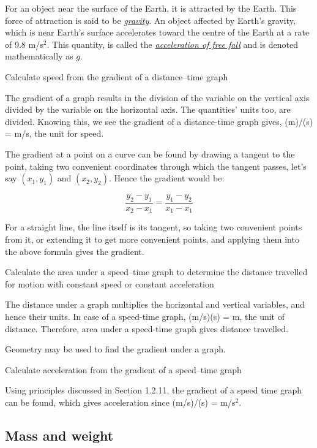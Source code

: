 For an object near the surface of the Earth, it is attracted by the Earth. This force of attraction
is said to be \ul{\emph{gravity}}. An object affected by Earth's gravity, which is near Earth's
surface accelerates toward the
centre of the Earth at a rate of 9.8 m/s$^2$. This quantity, is called the \ul{\emph{acceleration
of free fall}} and is denoted mathematically as $g$.

\begin{point}
Calculate speed from the gradient of a distance–time graph
\end{point}

The gradient of a graph results in the division of the variable on the vertical axis divided by
the variable on the horizontal axis. The quantities' units too, are divided. Knowing this, we
see the gradient of a distance-time graph gives, (m)/(s) = m/s, the unit for speed.

The gradient at a point on a curve can be found by drawing a tangent to the point, taking two
convenient coordinates through which the tangent passes, let's say $(x_1, y_1)$ and $(x_2, y_2)$.
Hence the gradient would be:

$$ \frac{y_2 - y_1}{x_2 - x_1} = \frac{y_1 - y_2}{x_1 - x_1} $$

For a straight line, the line itself is its tangent, so taking two convenient points from it,
or extending it to get more convenient points, and applying them into the above formula gives
the gradient.

\begin{point}
Calculate the area under a speed–time graph to determine the distance travelled for motion with constant
speed or constant acceleration
\end{point}

The distance under a graph multiplies the horizontal and vertical variables, and hence their units.
In case of a speed-time graph, (m/s)(s) = m, the unit of distance. Therefore, area under a
speed-time graph gives distance travelled.

Geometry may be used to find the gradient under a graph.

\begin{point}
Calculate acceleration from the gradient of a speed–time graph
\end{point}

Using principles discussed in Section 1.2.11, the gradient of a speed time graph can be found,
which gives acceleration since (m/s)/(s) = m/s$^2$.

\subsection{Mass and weight}
